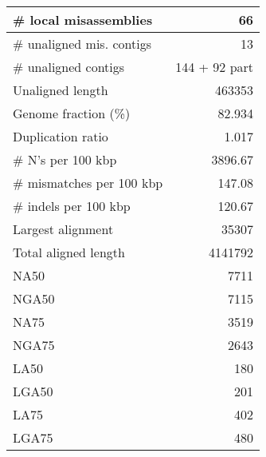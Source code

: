 \documentclass[12pt,a4paper]{article}
\begin{document}
\begin{table}[ht]
\begin{center}
\begin{tabular}{|l*{1}{|r}|}
\# local misassemblies & 66 \\ \hline
\# unaligned mis. contigs & 13 \\ \hline
\# unaligned contigs & 144 + 92 part \\ \hline
Unaligned length & 463353 \\ \hline
Genome fraction (\%) & 82.934 \\ \hline
Duplication ratio & 1.017 \\ \hline
\# N's per 100 kbp & 3896.67 \\ \hline
\# mismatches per 100 kbp & 147.08 \\ \hline
\# indels per 100 kbp & 120.67 \\ \hline
Largest alignment & 35307 \\ \hline
Total aligned length & 4141792 \\ \hline
NA50 & 7711 \\ \hline
NGA50 & 7115 \\ \hline
NA75 & 3519 \\ \hline
NGA75 & 2643 \\ \hline
LA50 & 180 \\ \hline
LGA50 & 201 \\ \hline
LA75 & 402 \\ \hline
LGA75 & 480 \\ \hline
\end{tabular}
\end{center}
\end{table}
\end{document}
